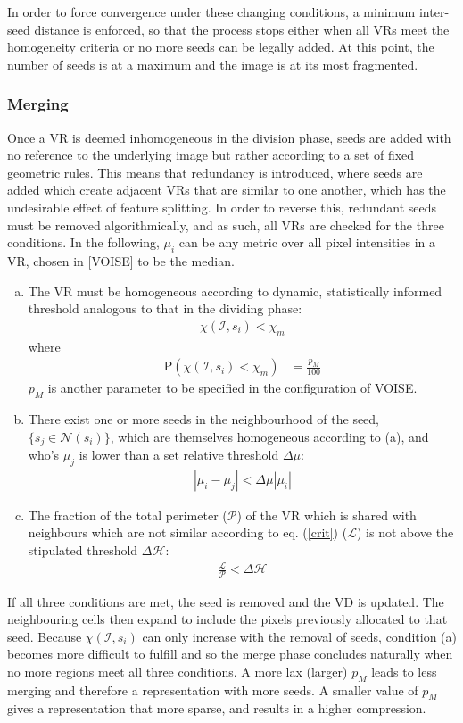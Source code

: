 \documentclass[12pt, report, a4paper, titlepage]{article}
\numberwithin{equation}{section}
\newcommand*{\citen}{}%
\DeclareRobustCommand*{\citen}[1]{%
  \begingroup
    \romannumeral-`\x %
    \setcitestyle{numbers}%
    \cite{#1}%
  \endgroup
}
\begin{document}
In order to force convergence under these changing conditions, a minimum inter-seed distance is enforced, so that the process stops either when all VRs meet the homogeneity criteria or no more seeds can be legally added. At this point, the number of seeds is at a maximum and the image is at its most fragmented.

\subsubsection{Merging}

Once a VR is deemed inhomogeneous in the division phase, seeds are added with no reference to the underlying image but rather according to a set of fixed geometric rules. This means that redundancy is introduced, where seeds are added which create adjacent VRs that are similar to one another, which has the undesirable effect of feature splitting. In order to reverse this, redundant seeds must be removed algorithmically, and as such, all VRs are checked for the three conditions. In the following, $\mu_i$ can be any metric over all pixel intensities in a VR, chosen in [\citen{VOISE}] to be the median.
\begin{enumerate}[(a)]
	\item The VR must be homogeneous according to dynamic, statistically informed threshold analogous to that in the dividing phase:
	\begin{align}
			\chi(\mathcal{I}, s_i) < \chi_m
		\end{align}
		where
		\begin{align}
			\text{P}\left(\chi(\mathcal{I}, s_i) < \chi_m\right) &= \frac{p_M}{100}
		\end{align}
		$p_M$ is another parameter to be specified in the configuration of VOISE.
	\item There exist one or more seeds in the neighbourhood of the seed, $\{s_j \in \mathcal{N}(s_i)\}$, which are themselves homogeneous according to (a), and who's $\mu_j$ is lower than a set relative threshold $\Delta \mu$:
	\begin{align}
	\label{crit}
		|\mu_i - \mu_j| < \Delta \mu |\mu_i|
	\end{align}
	\item The fraction of the total perimeter ($\mathcal{P}$) of the VR which is shared with neighbours which are not similar according to eq. (\ref{crit}) ($\mathcal{L}$) is not above the stipulated threshold $\Delta \mathcal{H}$:
	\begin{align}
		\frac{\mathcal{L}}{\mathcal{P}} < \Delta \mathcal{H}
	\end{align}
\end{enumerate}
If all three conditions are met, the seed is removed and the VD is updated. The neighbouring cells then expand to include the pixels previously allocated to that seed. Because $\chi(\mathcal{I}, s_i)$ can only increase with the removal of seeds, condition (a) becomes more difficult to fulfill and so the merge phase concludes naturally when no more regions meet all three conditions. A more lax (larger) $p_M$ leads to less merging and therefore a representation with more seeds. A smaller value of $p_M$ gives a representation that more sparse, and results in a higher compression.
\end{document}
